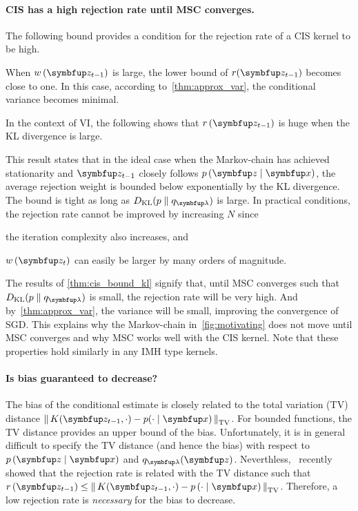 \vspace{-0.1in}
\paragraph{CIS has a high rejection rate until MSC converges.}
The following bound provides a condition for the rejection rate of a CIS kernel to be high.
%

%
When \(w\,(\vz_{t-1})\) is large, the lower bound of \(r(\vz_{t-1})\) becomes close to one.
In this case, according to~\cref{thm:approx_var}, the conditional variance becomes minimal.

In the context of VI, the following shows that \(r\,(\vz_{t-1})\) is huge when the KL divergence is large.
%

%
This result states that in the ideal case when the Markov-chain has achieved stationarity and \(\vz_{t-1}\) closely follows \(p\,(\vz\mid\vx)\), the average rejection weight is bounded below exponentially by the KL divergence.
The bound is tight as long as \(\DKL{p}{q_{\vlambda}}\) is large.
In practical conditions, the rejection rate cannot be improved by increasing \(N\) since
\begin{enumerate*}[label=(\roman*)]
  \item the iteration complexity also increases, and
  \item \(w\,(\vz_t)\) can easily be larger by many orders of magnitude.
\end{enumerate*}

The results of \cref{thm:cis_bound_kl} signify that, until MSC converges such that \(\DKL{p}{q_{\vlambda}}\) is small, the rejection rate will be very high.
And by~\cref{thm:approx_var}, the variance will be small, improving the convergence of SGD.
This explains why the Markov-chain in~\cref{fig:motivating} does not move until MSC converges and why MSC works well with the CIS kernel.
Note that these properties hold similarly in any IMH type kernels.


\vspace{-0.1in}
\paragraph{Is bias guaranteed to decrease?}
The bias of the conditional estimate is closely related to the total variation (TV) distance \(\DTV{K(\vz_{t-1}, \cdot)}{p(\cdot\mid\vx)}\).
For bounded functions, the TV distance provides an upper bound of the bias.
Unfortunately, it is in general difficult to specify the TV distance (and hence the bias) with respect to \(p\,(\vz\mid\vx)\) and \(q_{\vlambda}(\vz)\).
Neverthless,~\citet{wang_exact_2020} recently showed that the rejection rate is related with the TV distance such that \(r\,(\vz_{t-1}) \leq \DTV{K(\vz_{t-1}, \cdot)}{p\,(\cdot\mid\vx)}\).
Therefore, a low rejection rate is \textit{necessary} for the bias to decrease.

